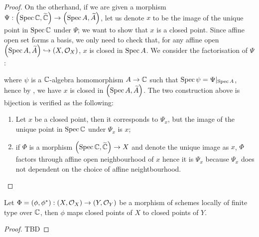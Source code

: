 \begin{proof}
  On the otherhand, if we are given a morphism $\Psi : \left(\operatorname*{Spec}{\mathbb{C}}, \widetilde{\mathbb{C}}\right) \to \left(\operatorname*{Spec}{A}, \widetilde{A}\right)$, let us denote $x$ to be the image of the unique point in $\operatorname{Spec} \mathbb{C}$ under $\Psi$; we want to show that $x$ is a closed point. Since affine open set forms a basis, we only need to check that, for any affine open $\left(\operatorname*{Spec}{A}, \widetilde{A}\right) \hookrightarrow \left(X, \mathcal{O}_{X}\right)$, $x$ is closed in $\operatorname{Spec} A$. We consider the factorisation of $\Psi$:
  \begin{center}
  \end{center}
  where $\psi$ is a $\mathbb{C}$-algebra homomorphism $A \to \mathbb{C}$ such that $\operatorname{Spec}{\psi} = \Psi|_{\operatorname{Spec} A}$, hence by , we have $x$ is closed in $\left(\operatorname*{Spec}{A}, \widetilde{A}\right)$.
  The two construction above is bijection is verified as the following:
  \begin{enumerate}
    \item Let $x$ be a closed point, then it corresponds to $\Psi_{x}$, but the image of the unique point in $\operatorname{Spec} \mathbb{C}$ under $\Psi_{x}$ is $x$;
    \item if $\Phi$ is a morphism $\left(\operatorname*{Spec}{\mathbb{C}}, \widetilde{\mathbb{C}}\right) \to X$ and denote the unique image as $x$,
          $\Phi$ factors through affine open neighbourhood of $x$ hence it is $\Psi_{x}$ because $\Psi_{x}$ does not dependent on the choice of affine neightbourhood.
  \end{enumerate}
\end{proof}

\begin{proposition}
  Let $\Phi = (\phi, \phi^{*}) : \left(X, \mathcal{O}_{X}\right) \to \left(Y, \mathcal{O}_{Y}\right)$ be a morphism of schemes locally of finite type over $\mathbb{C}$, then $\phi$ maps closed points of $X$ to closed points of $Y$.
  \label{thm:morph-maps-closed-points-to-closed-points}
\end{proposition}

\begin{proof}
  TBD
\end{proof}

